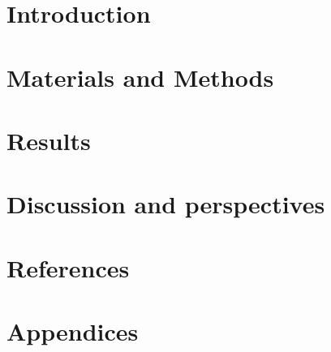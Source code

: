 \documentclass[11pt,a4paper]{report}
\begin{document}
\chapter{Introduction}


\chapter{Materials and Methods}


\chapter{Results}


\chapter{Discussion and perspectives}


\chapter*{References}
\printbibliography[heading=none]
\chapter*{Appendices}
\end{document}
